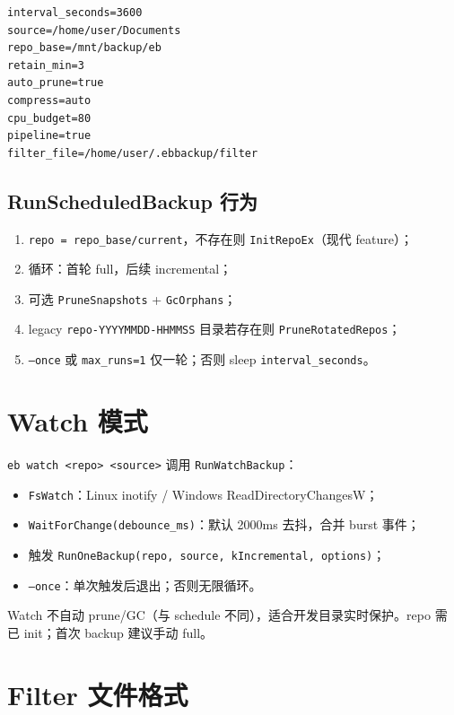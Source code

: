\begin{lstlisting}[caption={schedule.conf 示例},label={lst:schedule-ini}]
interval_seconds=3600
source=/home/user/Documents
repo_base=/mnt/backup/eb
retain_min=3
auto_prune=true
compress=auto
cpu_budget=80
pipeline=true
filter_file=/home/user/.ebbackup/filter
\end{lstlisting}

\subsection{RunScheduledBackup 行为}

\begin{enumerate}
  \item \texttt{repo = repo\_base/current}，不存在则 \texttt{InitRepoEx}（现代 feature）；
  \item 循环：首轮 full，后续 incremental；
  \item 可选 \texttt{PruneSnapshots} + \texttt{GcOrphans}；
  \item legacy \texttt{repo-YYYYMMDD-HHMMSS} 目录若存在则 \texttt{PruneRotatedRepos}；
  \item \texttt{--once} 或 \texttt{max\_runs=1} 仅一轮；否则 sleep \texttt{interval\_seconds}。
\end{enumerate}

\section{Watch 模式}

\texttt{eb watch <repo> <source>} 调用 \texttt{RunWatchBackup}：

\begin{itemize}[nosep]
  \item \texttt{FsWatch}：Linux inotify / Windows ReadDirectoryChangesW；
  \item \texttt{WaitForChange(debounce\_ms)}：默认 2000ms 去抖，合并 burst 事件；
  \item 触发 \texttt{RunOneBackup(repo, source, kIncremental, options)}；
  \item \texttt{--once}：单次触发后退出；否则无限循环。
\end{itemize}

Watch 不自动 prune/GC（与 schedule 不同），适合开发目录实时保护。repo 需已 init；首次 backup 建议手动 full。

\section{Filter 文件格式}

